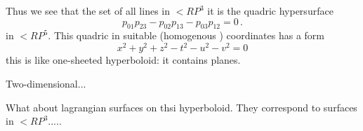 Thus we see that the set of all lines in $<R P^3$ it is the quadric hypersurface
                                $$
p_{01}p_{23}-p_{02}p_{13}-p_{03}p_{12}=0\,.
                                $$
in $<R P^5$. This quadric in suitable (homogenous ) coordinates has a form
                   $$
   x^2+y^2+z^2-t^2-u^2-v^2=0
                   $$
this is like one-sheeted hyperboloid: it contains planes.


Two-dimensional...



   What about lagrangian surfaces  on thsi hyperboloid.
   They correspond to surfaces in $<R P^3$.....


\bye
